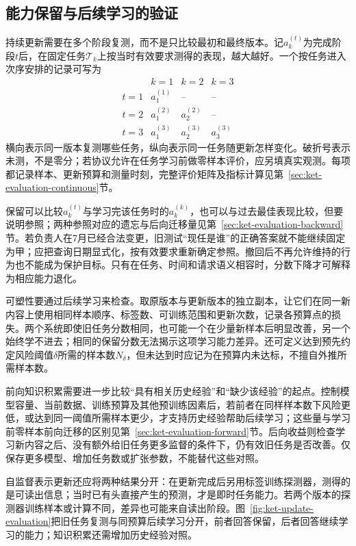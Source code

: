 \subsection{能力保留与后续学习的验证}
\label{sec:ket-update-retention-validation}

持续更新需要在多个阶段复测，而不是只比较最初和最终版本。记$a_k^{(t)}$为完成阶段$t$后，在固定任务$\mathcal T_k$上按当时有效要求测得的表现，越大越好。一个按任务进入次序安排的记录可写为
\[
\begin{array}{c|ccc}
 & k=1 & k=2 & k=3\\ \hline
t=1&a_1^{(1)}&\text{--}&\text{--}\\
t=2&a_1^{(2)}&a_2^{(2)}&\text{--}\\
t=3&a_1^{(3)}&a_2^{(3)}&a_3^{(3)}
\end{array}
\]
横向表示同一版本复测哪些任务，纵向表示同一任务随更新怎样变化。破折号表示未测，不是零分；若协议允许在任务学习前做零样本评价，应另填真实观测。每项都记录样本、更新预算和测量时刻，完整评价矩阵及指标计算见第~\ref{sec:ket-evaluation-continuous}节。

保留可以比较$a_k^{(t)}$与学习完该任务时的$a_k^{(k)}$，也可以与过去最佳表现比较，但要说明参照；两种参照对应的遗忘与后向迁移量见第~\ref{sec:ket-evaluation-backward}节。若负责人在7月已经合法变更，旧测试“现任是谁”的正确答案就不能继续固定为甲；应把查询日期显式化，按有效要求重新确定参照。撤回后不再允许维持的行为也不能成为保护目标。只有在任务、时间和请求语义相容时，分数下降才可解释为相应能力退化。

可塑性要通过后续学习来检查。取原版本与更新版本的独立副本，让它们在同一新内容上使用相同样本顺序、标签数、可训练范围和更新次数，记录各预算点的损失。两个系统即使旧任务分数相同，也可能一个在少量新样本后明显改善，另一个始终学不进去；相同的保留分数无法揭示这项学习能力差异。还可定义达到预先约定风险阈值$\delta$所需的样本数$N_\delta$，但未达到时应记为在预算内未达标，不擅自外推所需样本数。

前向知识积累需要进一步比较“具有相关历史经验”和“缺少该经验”的起点。控制模型容量、当前数据、训练预算及其他预训练因素后，若前者在同样样本数下风险更低，或达到同一阈值所需样本更少，才支持历史经验帮助后续学习；这些量与学习前零样本前向迁移的区别见第~\ref{sec:ket-evaluation-forward}节。后向收益则检查学习新内容之后、没有额外给旧任务更多监督的条件下，仍有效旧任务是否改善。仅保存更多模型、增加任务数或扩张参数，不能替代这些对照。

自监督表示更新还应将两种结果分开：在更新完成后另用标签训练探测器，测得的是可读出信息；当时已有头直接产生的预测，才是即时任务能力。若两个版本的探测器训练样本或计算不同，差异也可能来自读出阶段。图~\ref{fig:ket-update-evaluation}把旧任务复测与同预算后续学习分开，前者回答保留，后者回答继续学习的能力；知识积累还需增加历史经验对照。

